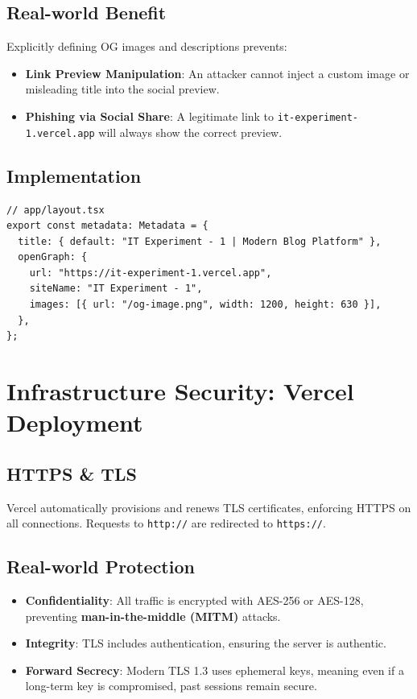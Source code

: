 \documentclass[11pt,a4paper]{article}
\begin{document}
\subsection{Real-world Benefit}
Explicitly defining OG images and descriptions prevents:
\begin{itemize}
    \item \textbf{Link Preview Manipulation}: An attacker cannot inject a custom image or misleading title into the social preview.
    \item \textbf{Phishing via Social Share}: A legitimate link to \texttt{it-experiment-1.vercel.app} will always show the correct preview.
\end{itemize}

\subsection{Implementation}
\begin{lstlisting}
// app/layout.tsx
export const metadata: Metadata = {
  title: { default: "IT Experiment - 1 | Modern Blog Platform" },
  openGraph: {
    url: "https://it-experiment-1.vercel.app",
    siteName: "IT Experiment - 1",
    images: [{ url: "/og-image.png", width: 1200, height: 630 }],
  },
};
\end{lstlisting}

\section{Infrastructure Security: Vercel Deployment}

\subsection{HTTPS \& TLS}
Vercel automatically provisions and renews TLS certificates, enforcing HTTPS on all connections. Requests to \texttt{http://} are redirected to \texttt{https://}.

\subsection{Real-world Protection}
\begin{itemize}
    \item \textbf{Confidentiality}: All traffic is encrypted with AES-256 or AES-128, preventing \textbf{man-in-the-middle (MITM)} attacks.
    \item \textbf{Integrity}: TLS includes authentication, ensuring the server is authentic.
    \item \textbf{Forward Secrecy}: Modern TLS 1.3 uses ephemeral keys, meaning even if a long-term key is compromised, past sessions remain secure.
\end{itemize}
\end{document}
